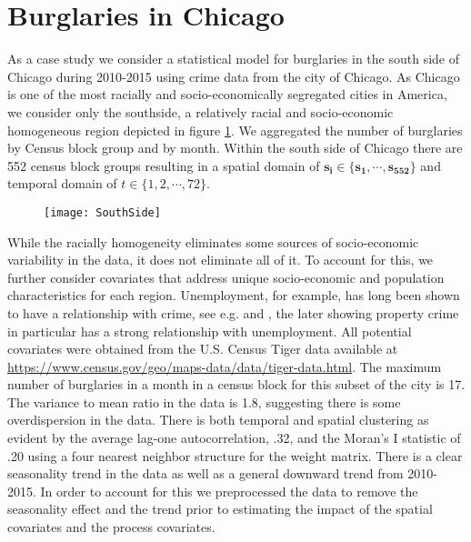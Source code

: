 \documentclass[11pt]{isuthesis}
\begin{document}
\section{Burglaries in Chicago}
As a case study we consider a statistical model for burglaries in the south side of Chicago during 2010-2015 using crime data from the city of Chicago. As Chicago is one of the most racially and socio-economically segregated cities in America, we consider only the southside, a relatively racial and socio-economic homogeneous region depicted in figure \ref{fig:SouthSide}.  We aggregated the number of burglaries by Census block group and by month.  Within the south side of Chicago there are 552 census block groups resulting in a spatial domain of $\boldsymbol{s_i} \in \{\boldsymbol{s_1},\cdots,\boldsymbol{s_{552}}\}$ and temporal domain of $t \in \{1,2,\cdots,72\}$.


\begin{figure}[!htp]
	\centering
	\texttt{[image: SouthSide]}
	\label{fig:SouthSide}
\end{figure}


While the racially homogeneity eliminates some sources of socio-economic variability in the data, it does not eliminate all of it.  To account for this, we further consider covariates that address unique socio-economic and population characteristics for each region. Unemployment, for example, has long been shown to have a relationship with crime, see e.g. \cite{britt1994crime} and \cite{raphael2001identifying}, the later showing property crime in particular has a strong relationship with unemployment.  All potential covariates were obtained from the U.S. Census Tiger data available at \href{https://www.census.gov/geo/maps-data/data/tiger-data.html}{https://www.census.gov/geo/maps-data/data/tiger-data.html}.  The maximum number of burglaries in a month in a census block for this subset of the city is 17.  The variance to mean ratio in the data is 1.8, suggesting there is some overdispersion in the data.  There is both temporal and spatial clustering as evident by the average lag-one autocorrelation, .32, and the Moran's I statistic of .20 using a four nearest neighbor structure for the weight matrix.  There is a clear seasonality trend in the data as well as a general downward trend from 2010-2015.  In order to account for this we preprocessed the data to remove the seasonality effect and the trend prior to estimating the impact of the spatial covariates and the process covariates.
\end{document}
